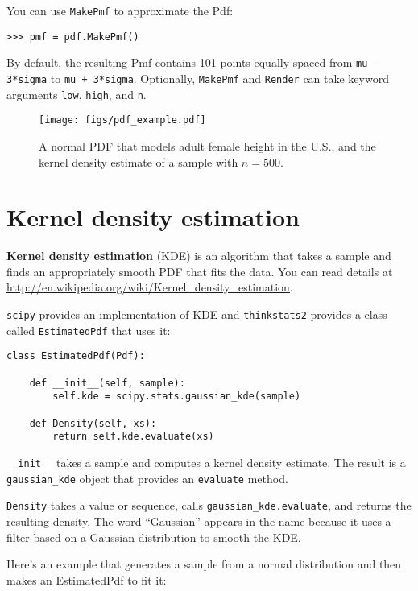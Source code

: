 \documentclass[12pt]{book}
\begin{document}
You can use {\tt MakePmf} to approximate the Pdf:

\begin{verbatim}
>>> pmf = pdf.MakePmf()
\end{verbatim}

By default, the resulting Pmf contains 101 points equally spaced from
{\tt mu - 3*sigma} to {\tt mu + 3*sigma}.  Optionally, {\tt MakePmf}
and {\tt Render} can take keyword arguments {\tt low}, {\tt high},
and {\tt n}.

\begin{figure}
\centerline{\texttt{[image: figs/pdf\_example.pdf]}}
\caption{A normal PDF that models adult female height in the U.S.,
and the kernel density estimate of a sample with $n=500$.}
\label{pdf_example}
\end{figure}


\section{Kernel density estimation} 

{\bf Kernel density estimation} (KDE) is an algorithm that takes
a sample and finds an appropriately smooth PDF that fits 
the data.  You can read details at
\url{http://en.wikipedia.org/wiki/Kernel_density_estimation}.

{\tt scipy} provides an implementation of KDE and {\tt thinkstats2}
provides a class called {\tt EstimatedPdf} that uses it:

\begin{verbatim}
class EstimatedPdf(Pdf):

    def __init__(self, sample):
        self.kde = scipy.stats.gaussian_kde(sample)

    def Density(self, xs):
        return self.kde.evaluate(xs)
\end{verbatim}

\verb"__init__" takes a sample
and computes a kernel density estimate.  The result is a
\verb"gaussian_kde" object that provides an {\tt evaluate}
method.

{\tt Density} takes a value or sequence, calls
\verb"gaussian_kde.evaluate", and returns the resulting density.  The
word ``Gaussian'' appears in the name because it uses a filter based
on a Gaussian distribution to smooth the KDE.  

Here's an example that generates a sample from a normal
distribution and then makes an EstimatedPdf to fit it:
\end{document}
